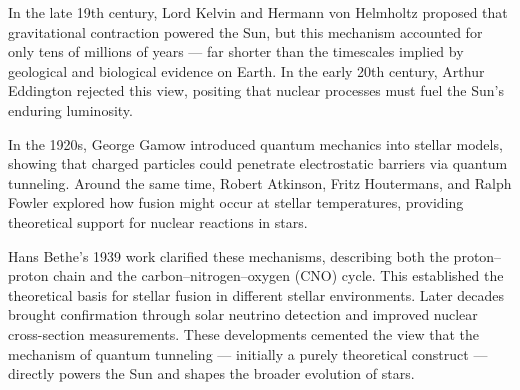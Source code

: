 \begin{historical}
In the late 19th century, Lord Kelvin and Hermann von Helmholtz proposed that gravitational contraction powered the Sun, but this mechanism accounted for only tens of millions of years — far shorter than the timescales implied by geological and biological evidence on Earth. In the early 20th century, Arthur Eddington rejected this view, positing that nuclear processes must fuel the Sun’s enduring luminosity.

In the 1920s, George Gamow introduced quantum mechanics into stellar models, showing that charged particles could penetrate electrostatic barriers via quantum tunneling. Around the same time, Robert Atkinson, Fritz Houtermans, and Ralph Fowler explored how fusion might occur at stellar temperatures, providing theoretical support for nuclear reactions in stars.

Hans Bethe’s 1939 work clarified these mechanisms, describing both the proton–proton chain and the carbon–nitrogen–oxygen (CNO) cycle. This established the theoretical basis for stellar fusion in different stellar environments. Later decades brought confirmation through solar neutrino detection and improved nuclear cross-section measurements. These developments cemented the view that the mechanism of quantum tunneling — initially a purely theoretical construct — directly powers the Sun and shapes the broader evolution of stars.
\end{historical}